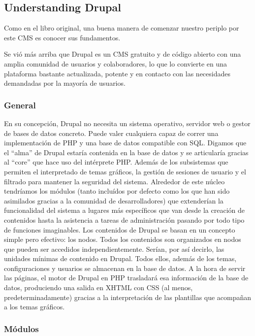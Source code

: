\subsection{Understanding Drupal}

\par Como en el libro original, una buena manera de comenzar nuestro periplo por este CMS es conocer sus fundamentos.
\par Se vió más arriba que Drupal es un CMS gratuito y de código abierto con una amplia comunidad de usuarios y colaboradores, lo que lo convierte en una plataforma bastante actualizada, potente y en contacto con las necesidades demandadas por la mayoría de usuarios.

\subsubsection{General} 

\par En su concepción, Drupal no necesita un sistema operativo, servidor web o gestor de bases de datos concreto. Puede valer cualquiera capaz de correr una implementación de PHP y una base de datos compatible con SQL. Digamos que el ``alma'' de Drupal estaría contenida en la base de datos y se articularía gracias al ``core'' que hace uso del intérprete PHP. Además de los subsistemas que permiten el interpretado de temas gráficos, la gestión de sesiones de usuario y el filtrado para mantener la seguridad del sistema. Alrededor de este núcleo tendríamos los módulos (tanto incluídos por defecto como los que han sido asimilados gracias a la comunidad de desarrolladores) que extenderían la funcionalidad del sistema a lugares más específicos que van desde la creación de contenidos hasta la asistencia a tareas de administración pasando por todo tipo de funciones imaginables.
Los contenidos de Drupal se basan en un concepto simple pero efectivo: los nodos. Todos los contenidos son organizados en nodos que pueden ser accedidos independientemente. Serían, por así decirlo, las unidades mínimas de contenido en Drupal. Todos ellos, además de los temas, configuraciones y usuarios se almacenan en la base de datos. A la hora de servir las páginas, el motor de Drupal en PHP trasladará esa información de la base de datos, produciendo una salida en XHTML con CSS (al menos, predeterminadamente) gracias a la interpretación de las plantillas que acompañan a los temas gráficos.

\subsubsection{Módulos} 

